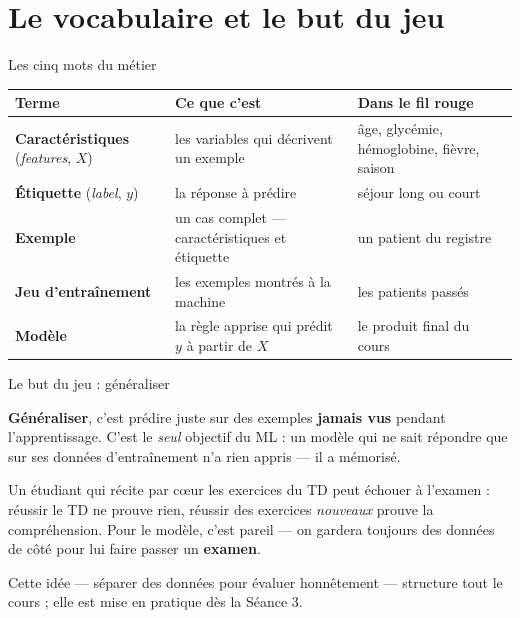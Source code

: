\documentclass[aspectratio=169,11pt]{beamer}
\begin{document}
\section{Le vocabulaire et le but du jeu}

\begin{frame}{Les cinq mots du métier}
\begin{center}\small \renewcommand{\arraystretch}{1.3}
\begin{tabular}{p{3.1cm} p{4.5cm} p{4.2cm}}
\textbf{Terme} & \textbf{Ce que c'est} & \textbf{Dans le fil rouge}\\\hline
\textbf{Caractéristiques} (\emph{features}, $X$) & les variables qui décrivent un exemple & âge, glycémie, hémoglobine, fièvre, saison\\
\textbf{Étiquette} (\emph{label}, $y$) & la réponse à prédire & séjour long ou court\\
\textbf{Exemple} & un cas complet — caractéristiques et étiquette & un patient du registre\\
\textbf{Jeu d'entraînement} & les exemples montrés à la machine & les patients passés\\
\textbf{Modèle} & la règle apprise qui prédit $y$ à partir de $X$ & le produit final du cours\\
\end{tabular}\end{center}
\end{frame}

\begin{frame}{Le but du jeu : généraliser}
\begin{ucaddef}[Définition]
{\small \textbf{Généraliser}, c'est prédire juste sur des exemples \textbf{jamais vus} pendant l'apprentissage. C'est le \emph{seul} objectif du ML : un modèle qui ne sait répondre que sur ses données d'entraînement n'a rien appris — il a mémorisé.}
\end{ucaddef}
\begin{ucadfront}[Analogie]
{\small Un étudiant qui récite par cœur les exercices du TD peut échouer à l'examen : réussir le TD ne prouve rien, réussir des exercices \emph{nouveaux} prouve la compréhension. Pour le modèle, c'est pareil — on gardera toujours des données de côté pour lui faire passer un \textbf{examen}.}
\end{ucadfront}
{\small Cette idée — séparer des données pour évaluer honnêtement — structure tout le cours ; elle est mise en pratique dès la Séance 3.}
\end{frame}
\end{document}
